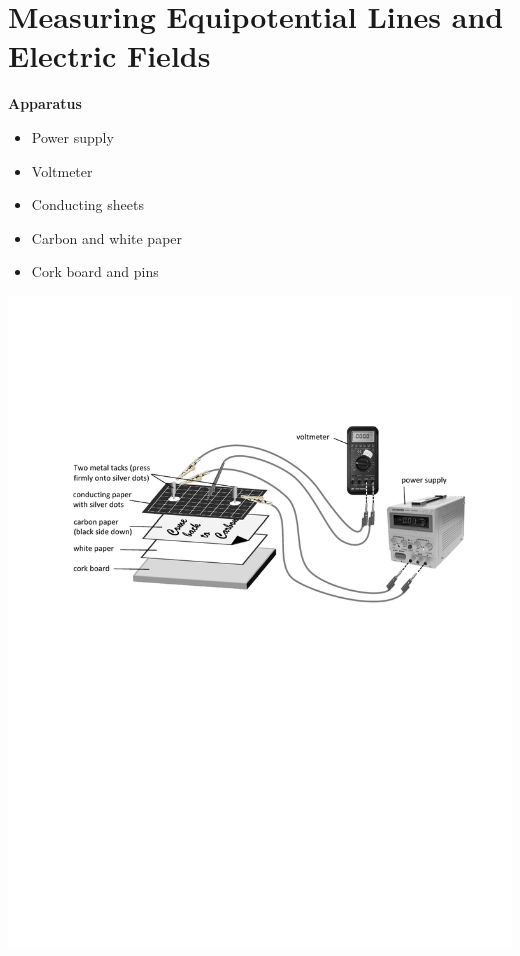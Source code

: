 \section{Measuring Equipotential Lines and Electric Fields}


\makelabheader %

\medskip
\textbf{Apparatus}
\begin{itemize}[nosep]
\item Power supply
\item Voltmeter
\item Conducting sheets
\item Carbon and white paper
\item Cork board and pins
\end{itemize}

\vspace{-0.5in}
{\raggedleft \includegraphics[scale=0.9]{electric_fields_and_equipotential_lines/apparatus_picture.pdf} \par}

